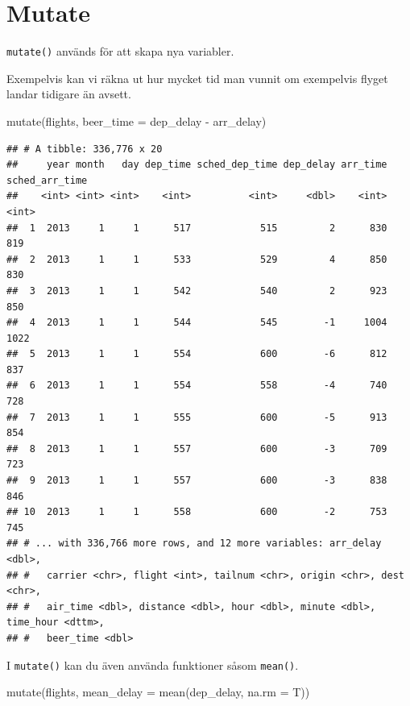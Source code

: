 \documentclass[
]{book}
\newenvironment{Shaded}{\begin{snugshade}}{\end{snugshade}}
\newcommand{\AttributeTok}[1]{\textcolor[rgb]{0.77,0.63,0.00}{#1}}
\newcommand{\FunctionTok}[1]{\textcolor[rgb]{0.00,0.00,0.00}{#1}}
\newcommand{\NormalTok}[1]{#1}
\newcommand{\SpecialCharTok}[1]{\textcolor[rgb]{0.00,0.00,0.00}{#1}}
\begin{document}
\hypertarget{mutate}{%
\section{Mutate}\label{mutate}}

\texttt{mutate()} används för att skapa nya variabler.

Exempelvis kan vi räkna ut hur mycket tid man vunnit om exempelvis flyget landar tidigare än avsett.

\begin{Shaded}
\begin{Highlighting}[]
\FunctionTok{mutate}\NormalTok{(flights, }\AttributeTok{beer\_time =}\NormalTok{ dep\_delay }\SpecialCharTok{{-}}\NormalTok{ arr\_delay)}
\end{Highlighting}
\end{Shaded}

\begin{verbatim}
## # A tibble: 336,776 x 20
##     year month   day dep_time sched_dep_time dep_delay arr_time sched_arr_time
##    <int> <int> <int>    <int>          <int>     <dbl>    <int>          <int>
##  1  2013     1     1      517            515         2      830            819
##  2  2013     1     1      533            529         4      850            830
##  3  2013     1     1      542            540         2      923            850
##  4  2013     1     1      544            545        -1     1004           1022
##  5  2013     1     1      554            600        -6      812            837
##  6  2013     1     1      554            558        -4      740            728
##  7  2013     1     1      555            600        -5      913            854
##  8  2013     1     1      557            600        -3      709            723
##  9  2013     1     1      557            600        -3      838            846
## 10  2013     1     1      558            600        -2      753            745
## # ... with 336,766 more rows, and 12 more variables: arr_delay <dbl>,
## #   carrier <chr>, flight <int>, tailnum <chr>, origin <chr>, dest <chr>,
## #   air_time <dbl>, distance <dbl>, hour <dbl>, minute <dbl>, time_hour <dttm>,
## #   beer_time <dbl>
\end{verbatim}

I \texttt{mutate()} kan du även använda funktioner såsom \texttt{mean()}.

\begin{Shaded}
\begin{Highlighting}[]
\FunctionTok{mutate}\NormalTok{(flights, }\AttributeTok{mean\_delay =} \FunctionTok{mean}\NormalTok{(dep\_delay, }\AttributeTok{na.rm =}\NormalTok{ T))}
\end{Highlighting}
\end{Shaded}
\end{document}
